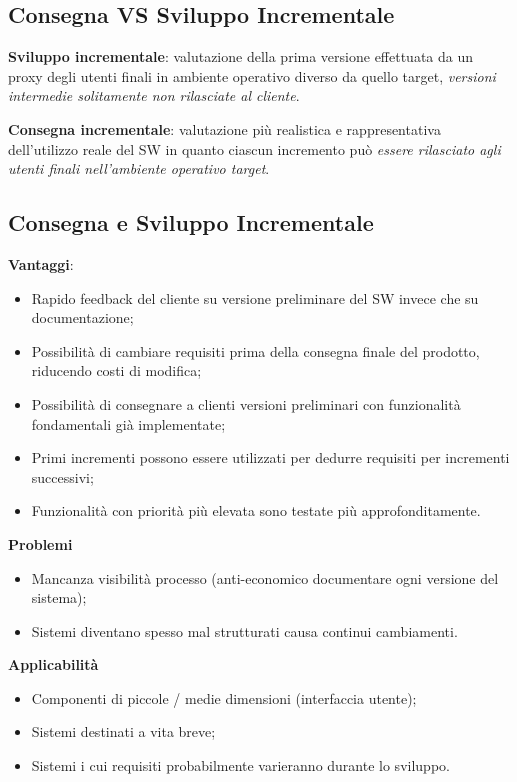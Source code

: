 \documentclass{article}
\begin{document}
    \subsection{Consegna VS Sviluppo Incrementale}
      \begin{minipage}{0.48\textwidth}
        \textbf{Sviluppo incrementale}: valutazione della prima versione effettuata da un proxy degli utenti finali in ambiente operativo diverso da quello target, \textit{versioni intermedie solitamente non rilasciate al cliente}. 
      \end{minipage}
      \hfill
      \begin{minipage}{0.48\textwidth}
        \textbf{Consegna incrementale}: valutazione più realistica e rappresentativa dell'utilizzo reale del SW in quanto ciascun incremento può \textit{essere rilasciato agli utenti finali nell'ambiente operativo target}.
      \end{minipage}
    \subsection{Consegna e Sviluppo Incrementale}
      \textbf{Vantaggi}:
      \begin{itemize}
        \item Rapido feedback del cliente su versione preliminare del SW invece che su documentazione;
        \item Possibilità di cambiare requisiti prima della consegna finale del prodotto, riducendo costi di modifica;
        \item Possibilità di consegnare a clienti versioni preliminari con funzionalità fondamentali già implementate;
        \item Primi incrementi possono essere utilizzati per dedurre requisiti per incrementi successivi;
        \item Funzionalità con priorità più elevata sono testate più approfonditamente.
      \end{itemize}
      \textbf{Problemi}
      \begin{itemize}
        \item Mancanza visibilità processo (anti-economico documentare ogni versione del sistema);
        \item Sistemi diventano spesso mal strutturati causa continui cambiamenti.
      \end{itemize}
      \textbf{Applicabilità}
      \begin{itemize}
        \item Componenti di piccole / medie dimensioni (interfaccia utente);
        \item Sistemi destinati a vita breve;
        \item Sistemi i cui requisiti probabilmente varieranno durante lo sviluppo.
      \end{itemize}
\end{document}

